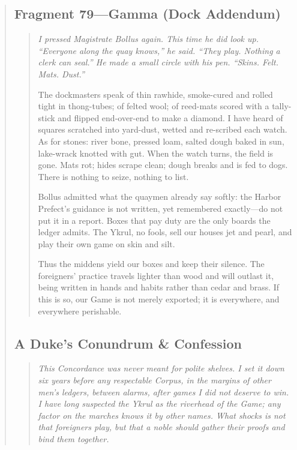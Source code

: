 \documentclass[11pt]{article}
\begin{document}
\begin{quote}
\medskip
\subsection*{Fragment 79—Gamma (Dock Addendum)}
\begin{quote}\small\itshape
\noindent I pressed Magistrate Bollus again. This time he did look up. “Everyone along the quay knows,” he said. “They play. Nothing a clerk can seal.” He made a small circle with his pen. “Skins. Felt. Mats. Dust.”

\medskip
\noindent The dockmasters speak of thin rawhide, smoke-cured and rolled tight in thong-tubes; of felted wool; of reed-mats scored with a tally-stick and flipped end-over-end to make a diamond. I have heard of squares scratched into yard-dust, wetted and re-scribed each watch. As for stones: river bone, pressed loam, salted dough baked in sun, lake-wrack knotted with gut. When the watch turns, the field is gone. Mats rot; hides scrape clean; dough breaks and is fed to dogs. There is nothing to seize, nothing to list.

\medskip
\noindent Bollus admitted what the quaymen already say softly: the Harbor Prefect’s guidance is not written, yet remembered exactly—do not put it in a report. Boxes that pay duty are the only boards the ledger admits. The Ykrul, no fools, sell our houses jet and pearl, and play their own game on skin and silt.

\medskip
\noindent Thus the middens yield our boxes and keep their silence. The foreigners’ practice travels lighter than wood and will outlast it, being written in hands and habits rather than cedar and brass. If this is so, our Game is not merely exported; it is everywhere, and everywhere perishable.
\end{quote}

\subsection*{A Duke’s Conundrum \& Confession}

\begin{quote}\small\itshape
This \emph{Concordance} was never meant for polite shelves. I set it down six years before any respectable \emph{Corpus}, in the margins of other men’s ledgers, between alarms, after games I did not deserve to win. I have long suspected the Ykrul as the riverhead of the Game; any factor on the marches knows it by other names. What shocks is not that foreigners play, but that a noble should gather their proofs and bind them together.


\end{quote}
\end{quote}
\end{document}
